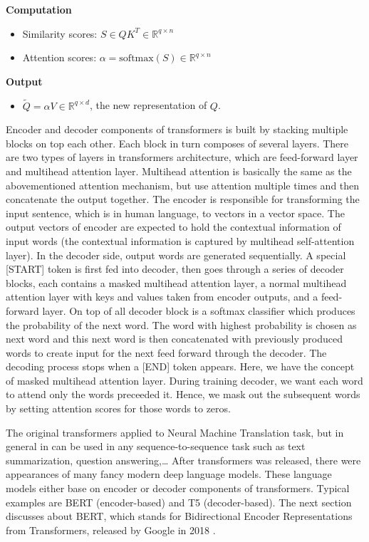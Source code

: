 \documentclass[3p, sort&compress, 12pt]{elsarticle}
\begin{document}
\par \textbf{Computation}
\begin{itemize}
	\item Similarity scores: $S \in QK^T \in \mathbb{R}^{q \times n}$
	\item Attention scores: $\mathbb{\alpha} = \text{softmax}(S) \in \mathbb{R}^{q \times n}$
\end{itemize}
\par \textbf{Output}
\begin{itemize}
	\item $\tilde{Q} = \mathbb{\alpha}V \in \mathbb{R}^{q \times d}$, the new representation of $Q$.
\end{itemize}
\par Encoder and decoder components of transformers is built by stacking multiple blocks on top each other. Each block in turn composes of several layers. There are two types of layers in transformers architecture, which are feed-forward layer and multihead attention layer. Multihead attention is basically the same as the abovementioned attention mechanism, but use attention multiple times and then concatenate the output together. The encoder is responsible for transforming the input sentence, which is in human language, to vectors in a vector space. The output vectors of encoder are expected to hold the contextual information of input words (the contextual information is captured by multihead self-attention layer). In the decoder side, output words are generated sequentially. A special [START] token is first fed into  decoder, then goes through a series of decoder blocks, each contains a masked multihead attention layer, a normal multihead attention layer with keys and values taken from encoder outputs, and a feed-forward layer. On top of all decoder block is a softmax classifier which produces the probability of the next word. The word with highest probability is chosen as next word and this next word is then concatenated with previously produced words to create input for the next feed forward through the decoder. The decoding process stops when a [END] token appears. Here, we have the concept of masked multihead attention layer. During training decoder, we want each word to attend only the words preceeded it. Hence, we mask out the subsequent words by setting attention scores for those words to zeros. 
\par The original transformers applied to Neural Machine Translation task, but in general in can be used in any sequence-to-sequence task such as text summarization, question answering,… After transformers was released, there were appearances of many fancy modern deep language models. These language models either base on encoder or decoder components of transformers. Typical examples are BERT (encoder-based) and T5 (decoder-based). The next section discusses about BERT, which stands for Bidirectional Encoder Representations from Transformers, released by Google in 2018 \cite{devlin2018bert}.
\end{document}
